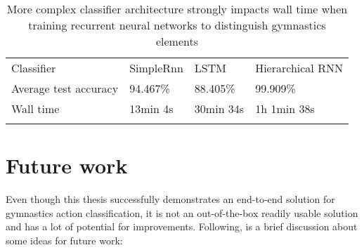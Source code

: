 \begin{table}[htb]
\begin{tabular}{llll}
Classifier            & SimpleRnn & LSTM      & Hierarchical RNN  \\
Average test accuracy & 94.467\%  & 88.405\%  &  99.909\%         \\
Wall time             & 13min 4s  & 30min 34s & 1h 1min 38s       \\
 &  &  &  
\end{tabular}
\caption{More complex classifier architecture strongly impacts wall time when training recurrent neural networks to distinguish gymnastics elements}
\label{classifier-wall-time}
\end{table}

\section{Future work}

Even though this thesis successfully demonstrates an end-to-end solution for gymnastics action classification, it is not an out-of-the-box readily usable solution and has a lot of potential for improvements. Following, is a brief discussion about some ideas for future work:

